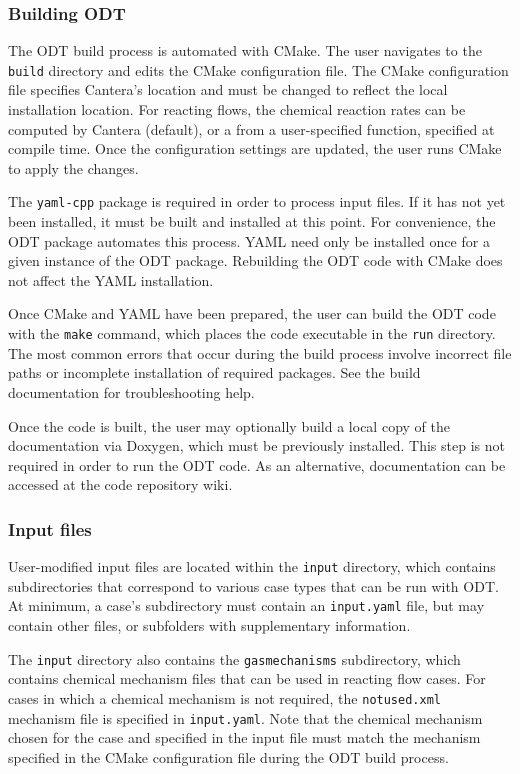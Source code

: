 \documentclass[preprint,12pt, a4paper]{elsarticle}
\begin{document}
\subsubsection{Building ODT}

The ODT build process is automated with CMake. The user navigates to the \texttt{build} directory and edits the CMake configuration file. The CMake configuration file specifies Cantera's location and must be changed to reflect the local installation location. For reacting flows, the chemical reaction rates can be computed by Cantera (default), or a from a user-specified function, specified at compile time. Once the configuration settings are updated, the user runs CMake to apply the changes. 

The \texttt{yaml-cpp} package is required in order to process input files. If it has not yet been installed, it must be built and installed at this point. For convenience, the ODT package automates this process. YAML need only be installed once for a given instance of the ODT package. Rebuilding the ODT code with CMake does not affect the YAML installation. 

Once CMake and YAML have been prepared, the user can build the ODT code with the \texttt{make} command, which places the code executable in the \texttt{run} directory. The most common errors that occur during the build process involve incorrect file paths or incomplete installation of required packages. See the build documentation for troubleshooting help. 

Once the code is built, the user may optionally build a local copy of the documentation via Doxygen, which must be previously installed. This step is not required in order to run the ODT code. As an alternative, documentation can be accessed at the code repository wiki. 

\subsubsection{Input files}

User-modified input files are located within the \texttt{input} directory, which contains subdirectories that correspond to various case types that can be run with ODT. At minimum, a case's subdirectory must contain an \texttt{input.yaml} file, but may contain other files, or subfolders with supplementary information. 

The \texttt{input} directory also contains the \texttt{gas\textunderscore mechanisms} subdirectory, which contains chemical mechanism files that can be used in reacting flow cases. For cases in which a chemical mechanism is not required, the \texttt{not\textunderscore used.xml} mechanism file is specified in \texttt{input.yaml}. Note that the chemical mechanism chosen for the case and specified in the input file must match the mechanism specified in the CMake configuration file during the ODT build process. 
\end{document}
